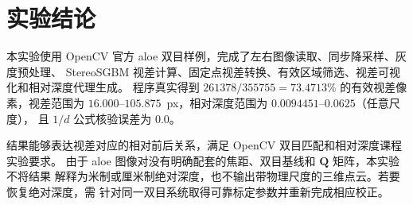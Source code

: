 \section{实验结论}

本实验使用 OpenCV 官方 aloe 双目样例，完成了左右图像读取、同步降采样、灰度预处理、
StereoSGBM 视差计算、固定点视差转换、有效区域筛选、视差可视化和相对深度代理生成。
程序真实得到 $261378/355755=73.4713\%$ 的有效视差像素，视差范围为
$16.000$--$105.875$~px，相对深度范围为 $0.0094451$--$0.0625$（任意尺度），
且 $1/d$ 公式核验误差为 $0.0$。

结果能够表达视差对应的相对前后关系，满足 OpenCV 双目匹配和相对深度课程实验要求。
由于 aloe 图像对没有明确配套的焦距、双目基线和 $\mathbf{Q}$ 矩阵，本实验不将结果
解释为米制或厘米制绝对深度，也不输出带物理尺度的三维点云。若要恢复绝对深度，需
针对同一双目系统取得可靠标定参数并重新完成相应校正。
